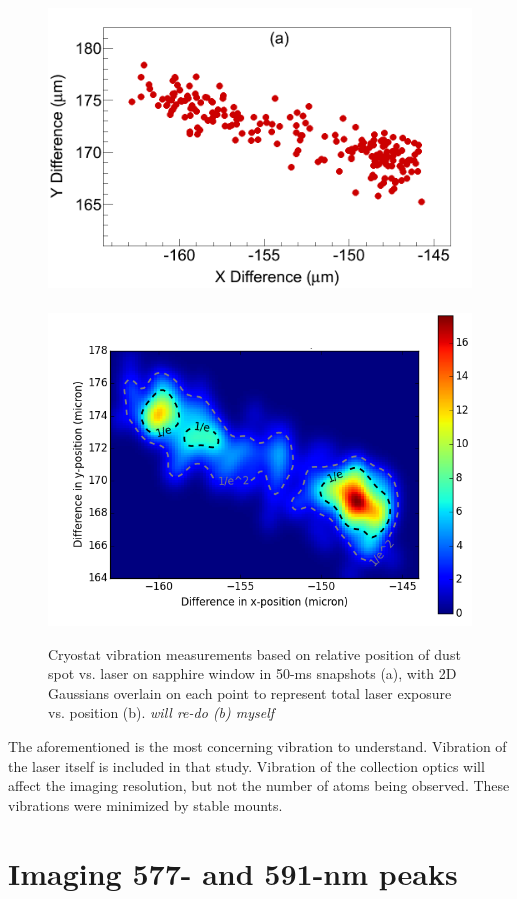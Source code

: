 \begin{figure} %
        \centering
                \includegraphics[width=.5\textwidth]{figures/cryovibes_a.png}
                ~
                \includegraphics[width=.5\textwidth]{figures/cryovibes_b_chris_run10_15_diff_func_wcontour.png}
                \caption{Cryostat vibration measurements based on relative position of dust spot vs. laser on sapphire window in 50-ms snapshots (a), with 2D Gaussians overlain on each point to represent total laser exposure vs. position (b). \emph{\color{red}will re-do (b) myself}}
\label{fig:cryovibe2D}
\end{figure}

The aforementioned is the most concerning vibration to understand.  Vibration of the laser itself is included in that study.  Vibration of the collection optics will affect the imaging resolution, but not the number of atoms being observed.  These vibrations were minimized by stable mounts.

\section{Imaging 577- and 591-nm peaks}
\label{sec:imaging590and577}


